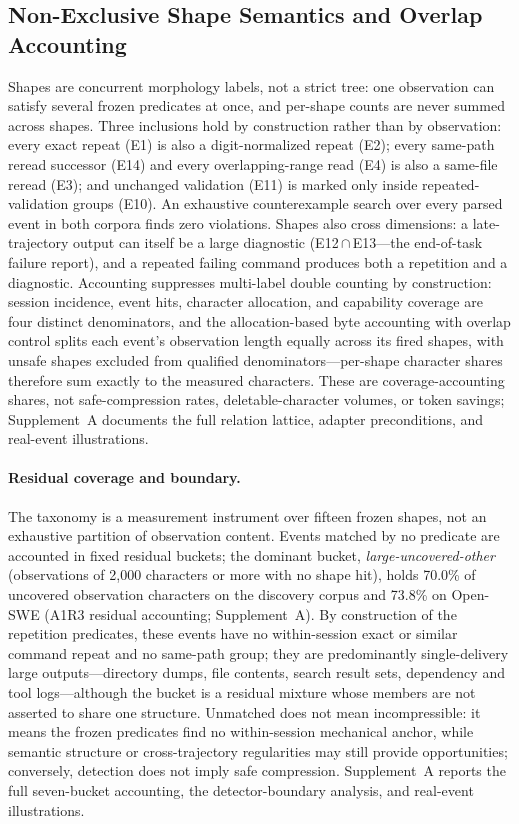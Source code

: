 ﻿\documentclass[sigconf,balance=false]{acmart}
\begin{document}
\subsection{Non-Exclusive Shape Semantics and Overlap Accounting}
\label{sec:overlap}

Shapes are concurrent morphology labels, not a strict tree: one observation can satisfy several frozen predicates at once, and per-shape counts are never summed across shapes. Three inclusions hold by construction rather than by observation: every exact repeat (E1) is also a digit-normalized repeat (E2); every same-path reread successor (E14) and every overlapping-range read (E4) is also a same-file reread (E3); and unchanged validation (E11) is marked only inside repeated-validation groups (E10). An exhaustive counterexample search over every parsed event in both corpora finds zero violations. Shapes also cross dimensions: a late-trajectory output can itself be a large diagnostic (E12\,$\cap$\,E13---the end-of-task failure report), and a repeated failing command produces both a repetition and a diagnostic. Accounting suppresses multi-label double counting by construction: session incidence, event hits, character allocation, and capability coverage are four distinct denominators, and the allocation-based byte accounting with overlap control splits each event's observation length equally across its fired shapes, with unsafe shapes excluded from qualified denominators---per-shape character shares therefore sum exactly to the measured characters. These are coverage-accounting shares, not safe-compression rates, deletable-character volumes, or token savings; Supplement~A documents the full relation lattice, adapter preconditions, and real-event illustrations.

\paragraph{Residual coverage and boundary.} The taxonomy is a measurement instrument over fifteen frozen shapes, not an exhaustive partition of observation content. Events matched by no predicate are accounted in fixed residual buckets; the dominant bucket, \emph{large-uncovered-other} (observations of 2,000 characters or more with no shape hit), holds 70.0\% of uncovered observation characters on the discovery corpus and 73.8\% on Open-SWE (A1R3 residual accounting; Supplement~A). By construction of the repetition predicates, these events have no within-session exact or similar command repeat and no same-path group; they are predominantly single-delivery large outputs---directory dumps, file contents, search result sets, dependency and tool logs---although the bucket is a residual mixture whose members are not asserted to share one structure. Unmatched does not mean incompressible: it means the frozen predicates find no within-session mechanical anchor, while semantic structure or cross-trajectory regularities may still provide opportunities; conversely, detection does not imply safe compression. Supplement~A reports the full seven-bucket accounting, the detector-boundary analysis, and real-event illustrations.
\end{document}
